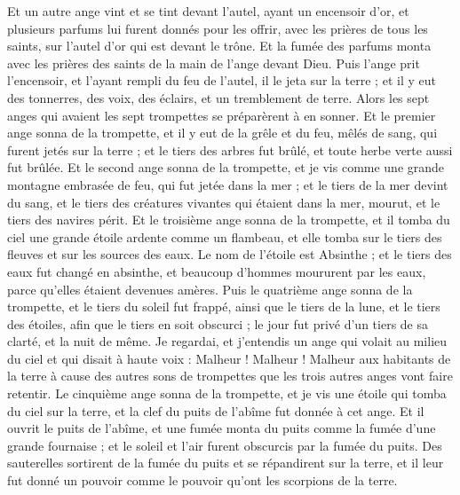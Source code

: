 \begin{multicols}{2}
Et un autre ange vint et se tint devant l'autel, ayant un encensoir d'or, et plusieurs parfums lui furent donnés pour les offrir, avec les prières de tous les saints, sur l'autel d'or qui est devant le trône.
Et la fumée des parfums monta avec les prières des saints de la main de l'ange devant Dieu.
Puis l'ange prit l'encensoir, et l'ayant rempli du feu de l'autel, il le jeta sur la terre ; et il y eut des tonnerres, des voix, des éclairs, et un tremblement de terre.
Alors les sept anges qui avaient les sept trompettes se préparèrent à en sonner.
Et le premier ange sonna de la trompette, et il y eut de la grêle et du feu, mêlés de sang, qui furent jetés sur la terre ; et le tiers des arbres fut brûlé, et toute herbe verte aussi fut brûlée.
Et le second ange sonna de la trompette, et je vis comme une grande montagne embrasée de feu, qui fut jetée dans la mer ; et le tiers de la mer devint du sang,
et le tiers des créatures vivantes qui étaient dans la mer, mourut, et le tiers des navires périt.
Et le troisième ange sonna de la trompette, et il tomba du ciel une grande étoile ardente comme un flambeau, et elle tomba sur le tiers des fleuves et sur les sources des eaux.
Le nom de l'étoile est Absinthe ; et le tiers des eaux fut changé en absinthe, et beaucoup d’hommes moururent par les eaux, parce qu’elles étaient devenues amères.
Puis le quatrième ange sonna de la trompette, et le tiers du soleil fut frappé, ainsi que le tiers de la lune, et le tiers des étoiles, afin que le tiers en soit obscurci ; le jour fut privé d’un tiers de sa clarté, et la nuit de même.
Je regardai, et j'entendis un ange qui volait au milieu du ciel et qui disait à haute voix : Malheur ! Malheur ! Malheur aux habitants de la terre à cause des autres sons de trompettes que les trois autres anges vont faire retentir.
\VerseOne{}Le cinquième ange sonna de la trompette, et je vis une étoile qui tomba du ciel sur la terre, et la clef du puits de l'abîme fut donnée à cet ange.
Et il ouvrit le puits de l'abîme, et une fumée monta du puits comme la fumée d'une grande fournaise ; et le soleil et l'air furent obscurcis par la fumée du puits.
Des sauterelles sortirent de la fumée du puits et se répandirent sur la terre, et il leur fut donné un pouvoir comme le pouvoir qu'ont les scorpions de la terre.

\end{multicols}
